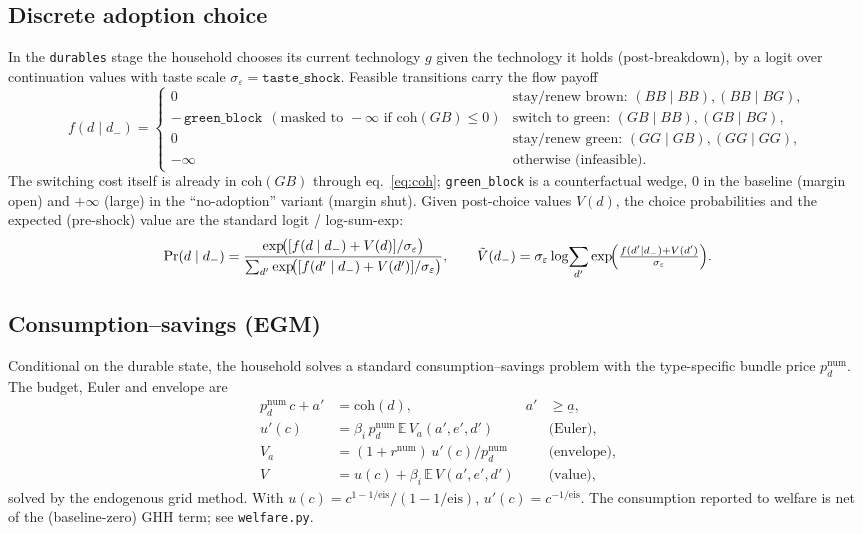 \documentclass[11pt]{article}
\newcommand{\E}{\mathbb{E}}
\newcommand{\num}{\mathrm{num}}
\newcommand{\coh}{\mathrm{coh}}
\begin{document}
\subsection{Discrete adoption choice}\label{sec:logit}

In the \texttt{durables} stage the household chooses its current technology $g$
given the technology it holds (post-breakdown), by a logit over continuation
values with taste scale $\sigma_\varepsilon=\texttt{taste\_shock}$. Feasible
transitions carry the flow payoff
\begin{equation}
f(d\mid d_-)=
\begin{cases}
0 & \text{stay/renew brown: } (BB\mid BB),(BB\mid BG),\\
-\,\texttt{green\_block}\ \ (\text{masked to }-\infty\text{ if }\coh(GB)\le 0)
& \text{switch to green: } (GB\mid BB),(GB\mid BG),\\
0 & \text{stay/renew green: } (GG\mid GB),(GG\mid GG),\\
-\infty & \text{otherwise (infeasible).}
\end{cases}
\end{equation}
The switching cost itself is already in $\coh(GB)$ through
eq.~\eqref{eq:coh}; \texttt{green\_block} is a counterfactual wedge, $0$ in the
baseline (margin open) and $+\infty$ (large) in the ``no-adoption'' variant
(margin shut). Given post-choice values $V(d)$, the choice probabilities and the
expected (pre-shock) value are the standard logit / log-sum-exp:
\begin{equation}
\Pr(d\mid d_-)=\frac{\exp\!\bigl([f(d\mid d_-)+V(d)]/\sigma_\varepsilon\bigr)}
{\sum_{d'}\exp\!\bigl([f(d'\mid d_-)+V(d')]/\sigma_\varepsilon\bigr)},
\qquad
\tilde V(d_-)=\sigma_\varepsilon\log\!\sum_{d'}\exp\!\Bigl(\tfrac{f(d'\mid d_-)+V(d')}{\sigma_\varepsilon}\Bigr).
\end{equation}

\subsection{Consumption--savings (EGM)}

Conditional on the durable state, the household solves a standard
consumption--savings problem with the type-specific bundle price $p_d^{\num}$.
The budget, Euler and envelope are
\begin{align}
p_d^{\num}\,c + a' &= \coh(d), & a'&\ge \underline a, \label{eq:budget}\\
u'(c) &= \beta_i\,p_d^{\num}\,\E\,V_a(a',e',d') & &\text{(Euler)},\\
V_a &= (1+r^{\num})\,u'(c)/p_d^{\num} & &\text{(envelope)},\\
V &= u(c)+\beta_i\,\E\,V(a',e',d') & &\text{(value)},
\end{align}
solved by the endogenous grid method. With $u(c)=c^{1-1/\text{eis}}/(1-1/\text{eis})$,
$u'(c)=c^{-1/\text{eis}}$. The consumption reported to welfare is net of the
(baseline-zero) GHH term; see \texttt{welfare.py}.
\end{document}
